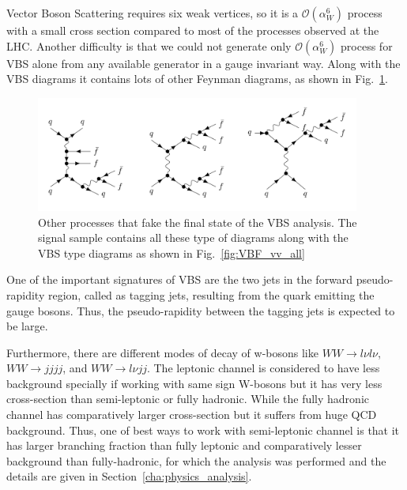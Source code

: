 Vector Boson Scattering requires six weak vertices, so it is a $\mathcal{O}(\alpha^6_W)$ process with a small cross section compared to most of the processes observed at the LHC. Another difficulty is that we could not generate only $\mathcal{O}(\alpha^6_W)$ process for VBS alone from any available generator in a gauge invariant way. Along with the VBS diagrams it contains lots of other Feynman diagrams, as shown in Fig.~\ref{fig:non-vbs}.
\begin{figure}[htbp]
    \centering
    \includegraphics[width=0.95\textwidth]{Pictures/non-vbs.png}
    \caption{Other processes that fake the final state of the VBS analysis. The signal sample contains all these type of diagrams along with the VBS type diagrams as shown in Fig.~\ref{fig:VBF_vv_all}}
    \label{fig:non-vbs}
\end{figure}


One of the important signatures of VBS are the two jets in the forward pseudo-rapidity region, called as tagging jets, resulting from the quark emitting the gauge bosons. Thus, the pseudo-rapidity between the tagging jets is expected to be large.

Furthermore, there are different modes of decay of w-bosons like $WW \rightarrow l \nu l\nu $, $WW \rightarrow jj jj $, and $WW \rightarrow l \nu jj$. The leptonic channel is considered to have less background specially if working with same sign W-bosons but it has very less cross-section than semi-leptonic or fully hadronic. While the fully hadronic channel has comparatively larger cross-section but it suffers from huge QCD background. Thus, one of best ways to work with semi-leptonic channel is that it has larger branching fraction than fully leptonic and comparatively lesser background than fully-hadronic, for which the analysis was performed and the details are given in Section~\ref{cha:physics_analysis}.
% 


